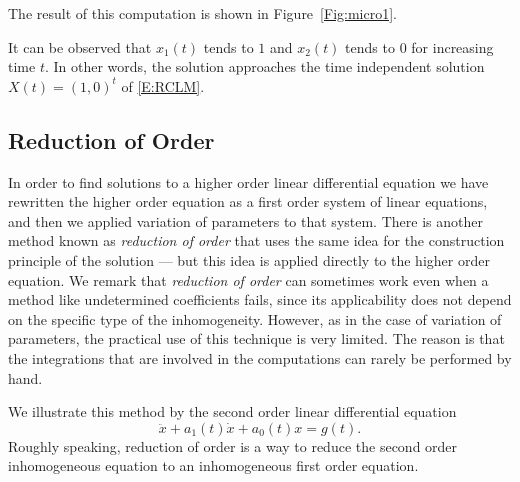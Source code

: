 \documentclass{ximera}
\begin{document}
The result of this computation is shown in Figure~\ref{Fig:micro1}.
\begin{figure*}[htb]
 \centerline{%
	   }
           \caption{The two components of the solution of 
	   \protect\eqref{E:RCLM} for $t\in[0,30]$ with initial
	   condition $X(0)=(1,1)^t$.}
           \label{Fig:micro1}
\end{figure*}
It can be observed that $x_1(t)$ tends to $1$ and $x_2(t)$ tends to
$0$ for increasing time $t$.  In other words, the solution approaches the 
time independent solution $X(t)=(1,0)^t$ of \eqref{E:RCLM}.

\subsection*{Reduction of Order}

In order to find solutions to a higher order linear differential equation 
we have rewritten the higher order equation as a first order
system of linear equations, and then we applied variation of
parameters to that system.  There is another method known as
{\em reduction of order\/} that uses the same idea for the
construction principle of the solution --- but this idea is applied directly 
to the higher order equation.  We remark that {\em reduction of
order\/} can sometimes work even when a method like undetermined 
coefficients fails, since its applicability does not depend on the 
specific type of the inhomogeneity.  However, as in the case 
of variation of parameters, the practical use of this technique is very 
limited.  The reason is that the integrations that are involved in the 
computations can rarely be performed by hand.


We illustrate this method by the second order linear differential 
equation
\begin{equation}  \label{e:inhom2}
\ddot{x} + a_1(t)\dot{x} + a_0(t)x = g(t).
\end{equation}
Roughly speaking, reduction of order is a way to reduce the second order 
inhomogeneous equation to an inhomogeneous first order equation.
\end{document}
